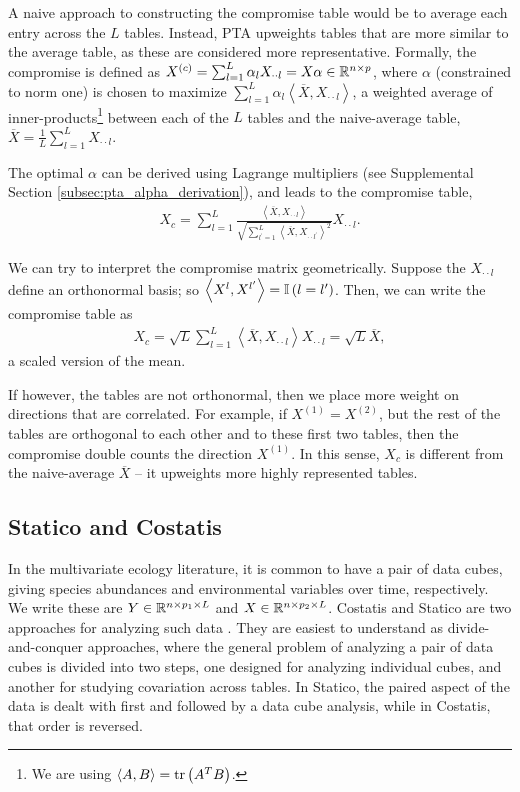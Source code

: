 \documentclass[14pt]{extarticle}
\begin{document}
A naive approach to constructing the compromise table would be to average each
entry across the $L$ tables. Instead, PTA upweights tables that are more similar
to the average table, as these are considered more representative. Formally, the
compromise is defined as $X^{(c)} = \sum_{l = 1}^{L}\alpha_{l} X_{\cdot\cdot l}
= X\alpha \in \mathbb{R}^{n \times p}$, where $\alpha$ (constrained to norm one) is
chosen to maximize $\sum_{l = 1}^{L} \alpha_{l} \left<\overline{X},
X_{\cdot\cdot l}\right>$, a weighted average of inner-products\footnote{We are
  using $\left<A, B\right> = \mathop\mathrm{tr}\left(A^{T}B\right)$.} between each of the $L$
tables and the naive-average table, $\overline{X} = \frac{1}{L}\sum_{l = 1}^{L}
X_{\cdot\cdot l}$.

The optimal $\alpha$ can be derived using Lagrange multipliers (see Supplemental
Section \ref{subsec:pta_alpha_derivation}), and leads to the compromise table,
\begin{align*}
  X_{c} = \sum_{l = 1}^{L} \frac{\left<\overline{X}, X_{\cdot\cdot l}\right>}{\sqrt{\sum_{l^{\prime}
      =1}^{L}\left<\overline{X},
      X_{\cdot\cdot l^{\prime}}\right>^{2}}} X_{\cdot\cdot l}.
\end{align*}

We can try to interpret the compromise matrix geometrically. Suppose
the $X_{\cdot\cdot l}$ define an orthonormal basis; so $\left<X^{l},
  X^{l^{\prime}}\right> = \mathbb{I}\left({l = l^{\prime}}\right)$. Then, we can write
the compromise table as
\begin{align*}
  X_{c} = \sqrt{L}\sum_{l = 1}^{L}\left<\overline{X},
    X_{\cdot\cdot l}\right>X_{\cdot\cdot l} = \sqrt{L}\overline{X},
\end{align*}
a scaled version of the mean.

If however, the tables are not orthonormal, then we place more weight
on directions that are correlated. For example, if $X^{(1)} =
X^{(2)}$, but the rest of the tables are orthogonal to each other and
to these first two tables, then the compromise double counts the
direction $X^{(1)}$. In this sense, $X_{c}$ is different from the
naive-average $\overline{X}$ -- it upweights more highly
represented tables.

\subsection{Statico and Costatis}
\label{subsec:statico_and_costatis}

In the multivariate ecology literature, it is common to have a pair of data
cubes, giving species abundances and environmental variables over time,
respectively. We write these are $Y \in \mathbb{R}^{n \times p_{1} \times L}$ and $X
\in \mathbb{R}^{n \times p_{2} \times L}$. Costatis and Statico are two approaches
for analyzing such data \cite{thioulouse2011simultaneous}. They are easiest to
understand as divide-and-conquer approaches, where the general problem of
analyzing a pair of data cubes is divided into two steps, one designed for analyzing
individual cubes, and another for studying covariation across tables. In Statico, the paired
aspect of the data is dealt with first and followed by a data cube analysis,
while in Costatis, that order is reversed.
\end{document}
